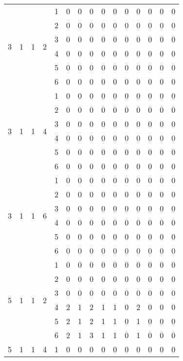 \begin{longtable}{|c|c|c|c|c|c c|c c|c c|c c|c c|}
\hline
\multirow{6}{*}{3} & \multirow{6}{*}{1} & \multirow{6}{*}{1} & \multirow{6}{*}{2} & 1 & 0 & 0 & 0 & 0 & 0 & 0 & 0 & 0 & 0 & 0 \\
 & & & & 2 & 0 & 0 & 0 & 0 & 0 & 0 & 0 & 0 & 0 & 0 \\
 & & & & 3 & 0 & 0 & 0 & 0 & 0 & 0 & 0 & 0 & 0 & 0 \\
 & & & & 4 & 0 & 0 & 0 & 0 & 0 & 0 & 0 & 0 & 0 & 0 \\
 & & & & 5 & 0 & 0 & 0 & 0 & 0 & 0 & 0 & 0 & 0 & 0 \\
 & & & & 6 & 0 & 0 & 0 & 0 & 0 & 0 & 0 & 0 & 0 & 0 \\
\hline
\multirow{6}{*}{3} & \multirow{6}{*}{1} & \multirow{6}{*}{1} & \multirow{6}{*}{4} & 1 & 0 & 0 & 0 & 0 & 0 & 0 & 0 & 0 & 0 & 0 \\
 & & & & 2 & 0 & 0 & 0 & 0 & 0 & 0 & 0 & 0 & 0 & 0 \\
 & & & & 3 & 0 & 0 & 0 & 0 & 0 & 0 & 0 & 0 & 0 & 0 \\
 & & & & 4 & 0 & 0 & 0 & 0 & 0 & 0 & 0 & 0 & 0 & 0 \\
 & & & & 5 & 0 & 0 & 0 & 0 & 0 & 0 & 0 & 0 & 0 & 0 \\
 & & & & 6 & 0 & 0 & 0 & 0 & 0 & 0 & 0 & 0 & 0 & 0 \\
\hline
\multirow{6}{*}{3} & \multirow{6}{*}{1} & \multirow{6}{*}{1} & \multirow{6}{*}{6} & 1 & 0 & 0 & 0 & 0 & 0 & 0 & 0 & 0 & 0 & 0 \\
 & & & & 2 & 0 & 0 & 0 & 0 & 0 & 0 & 0 & 0 & 0 & 0 \\
 & & & & 3 & 0 & 0 & 0 & 0 & 0 & 0 & 0 & 0 & 0 & 0 \\
 & & & & 4 & 0 & 0 & 0 & 0 & 0 & 0 & 0 & 0 & 0 & 0 \\
 & & & & 5 & 0 & 0 & 0 & 0 & 0 & 0 & 0 & 0 & 0 & 0 \\
 & & & & 6 & 0 & 0 & 0 & 0 & 0 & 0 & 0 & 0 & 0 & 0 \\
\hline
\multirow{6}{*}{5} & \multirow{6}{*}{1} & \multirow{6}{*}{1} & \multirow{6}{*}{2} & 1 & 0 & 0 & 0 & 0 & 0 & 0 & 0 & 0 & 0 & 0 \\
 & & & & 2 & 0 & 0 & 0 & 0 & 0 & 0 & 0 & 0 & 0 & 0 \\
 & & & & 3 & 0 & 0 & 0 & 0 & 0 & 0 & 0 & 0 & 0 & 0 \\
 & & & & 4 & 2 & 1 & 2 & 1 & 1 & 0 & 2 & 0 & 0 & 0 \\
 & & & & 5 & 2 & 1 & 2 & 1 & 1 & 0 & 1 & 0 & 0 & 0 \\
 & & & & 6 & 2 & 1 & 3 & 1 & 1 & 0 & 1 & 0 & 0 & 0 \\
\hline
\multirow{6}{*}{5} & \multirow{6}{*}{1} & \multirow{6}{*}{1} & \multirow{6}{*}{4} & 1 & 0 & 0 & 0 & 0 & 0 & 0 & 0 & 0 & 0 & 0 \\

\end{longtable}

